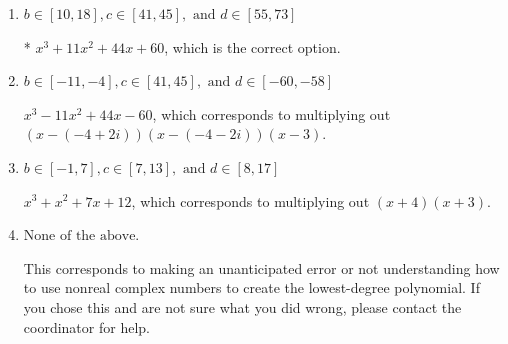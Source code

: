 \documentclass{extbook}[14pt]
\begin{document}
\begin{enumerate}
{\begin{enumerate}[label=\Alph*.]
$x^{3} + x^{2} +x -6$, which corresponds to multiplying out $(x -2)(x + 3)$.
\item \( b \in [10, 18], c \in [41, 45], \text{ and } d \in [55, 73] \)

* $x^{3} +11 x^{2} +44 x + 60$, which is the correct option.
\item \( b \in [-11, -4], c \in [41, 45], \text{ and } d \in [-60, -58] \)

$x^{3} -11 x^{2} +44 x -60$, which corresponds to multiplying out $(x-(-4 + 2 i))(x-(-4 - 2 i))(x -3)$.
\item \( b \in [-1, 7], c \in [7, 13], \text{ and } d \in [8, 17] \)

$x^{3} + x^{2} +7 x + 12$, which corresponds to multiplying out $(x + 4)(x + 3)$.
\item \( \text{None of the above.} \)

This corresponds to making an unanticipated error or not understanding how to use nonreal complex numbers to create the lowest-degree polynomial. If you chose this and are not sure what you did wrong, please contact the coordinator for help.
\end{enumerate}

}
\end{enumerate}
\end{document}
